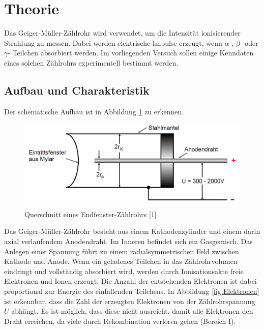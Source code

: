 \section{Theorie}
\label{sec:Theorie}

Das Geiger-Müller-Zählrohr wird verwendet, um die Intensität ionisierender Strahlung 
zu messen. Dabei werden elektrische Impulse erzeugt, wenn $\alpha$-, $\beta$- oder
$\gamma$- Teilchen absorbiert werden. Im vorliegenden Versuch sollen einige Kenndaten 
eines solchen Zählrohrs experimentell bestimmt werden. 

\subsection{Aufbau und Charakteristik}

Der schematische Aufbau ist in Abbildung \ref{fig:aufbau} zu erkennen. 

\begin{figure}
  \centering
  \includegraphics[scale=0.4]{content/Querschnitt.png}
  \caption{Querschnitt eines Endfenster-Zählrohrs [1]}
  \label{fig:aufbau}
\end{figure}

Das Geiger-Müller-Zählrohr besteht aus einem Kathodenzylinder und einem darin axial
verlaufendem Anodendraht. Im Inneren befindet sich ein Gasgemisch. Das Anlegen einer
Spannung führt zu einem radialsymmetrischen Feld zwischen Kathode und Anode. 
Wenn ein geladenes Teilchen in das Zählrohrvolumen eindringt und vollständig 
absorbiert wird, werden durch Ionisationsakte freie Elektronen und Ionen erzeugt. 
Die Anzahl der entstehenden Elektronen ist dabei proportional zur Energie des 
einfallenden Teilchens. In Abbildung \ref{fig:Elektronen} ist erkennbar, dass die Zahl der erzeugten
Elektronen von der Zählrohrspannung $U$ abhängt. Es ist möglich, dass diese nicht 
ausreicht, damit alle Elektronen den Draht erreichen, da viele durch Rekombination 
verloren gehen (Bereich I). 

